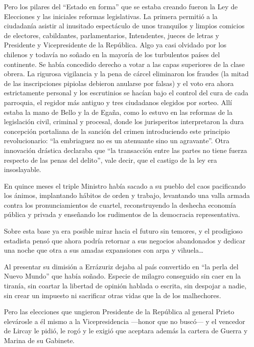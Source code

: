\documentclass[10pt,twoside,openright]{memoir}
\begin{document}
Pero los pilares del ``Estado en forma'' que se estaba creando fueron la
Ley de Elecciones y las iniciales reformas legislativas. La primera
permitió a la ciudadanía asistir al inusitado espectáculo de unos
tranquilos y limpios comicios de electores, cabildantes, parlamentarios,
Intendentes, jueces de letras y Presidente y Vicepresidente de la
República. Algo ya casi olvidado por los chilenos y todavía no soñado en
la mayoría de los turbulentos países del continente. Se había concedido
derecho a votar a las capas superiores de la clase obrera. La
rigurosa vigilancia y la pena de cárcel eliminaron los fraudes (la mitad
de las inscripciones pipiolas debieron anularse por falsas) y el voto
era ahora estrictamente personal y los escrutinios se hacían bajo el
control del cura de cada parroquia, el regidor más antiguo y tres
ciudadanos elegidos por sorteo. Allí estaba la mano de Bello y la de
Egaña, como  lo estuvo en las
reformas de la legislación civil, criminal y procesal, donde los
jurisperitos interpretaron la dura concepción portaliana de la sanción
del crimen introduciendo este principio revolucionario: ``la embriaguez
no es un atenuante sino un agravante''. Otra innovación drástica
declaraba que ``la transacción entre las partes no tiene fuerza respecto
de las penas del delito'', vale decir, que el castigo de la ley era
insoslayable.

 En quince meses el triple Ministro
había sacado a su pueblo del caos pacificando los ánimos, implantando
hábitos de orden y trabajo, levantando una valla armada contra los
pronunciamientos de cuartel, reconstruyendo la deshecha economía pública
y privada y enseñando los rudimentos de la democracia representativa.

Sobre esta base ya era posible mirar hacia el futuro sin temores, y el
prodigioso estadista pensó que ahora podría retornar a sus negocios
abandonados y dedicar una noche que otra a sus amadas expansiones con
arpa y vihuela\ldots{}

Al presentar su dimisión a Errázuriz dejaba al país convertido en ``la
perla del Nuevo Mundo'' que había soñado. Especie de milagro conseguido
sin caer en la tiranía, sin coartar la libertad de opinión
hablada o escrita, sin despojar a
nadie, sin crear un impuesto ni sacrificar otras vidas que la de los
malhechores.

 Pero las elecciones que ungieron
Presidente de la República al general Prieto elevárosle a él mismo a la
Vicepresidencia ---honor que no buscó--- y el vencedor
de Lircay le pidió, le rogó y le
exigió que aceptara además la cartera de Guerra y Marina de su Gabinete.
\end{document}
